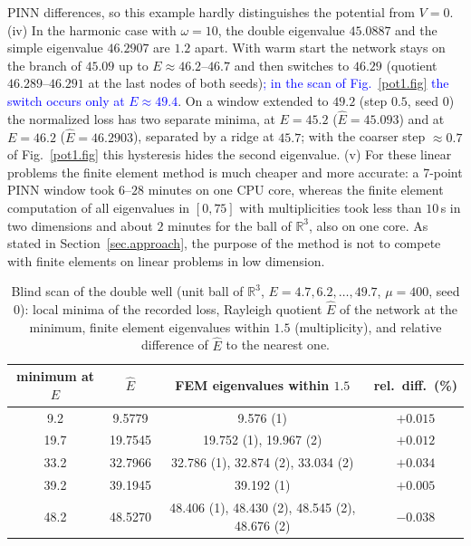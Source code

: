 \documentclass[10pt]{amsart}
\newcommand{\rev}[1]{\textcolor{blue}{#1}}
\newenvironment{revblock}{\color{blue}}{}
\theoremstyle{definition}
\theoremstyle{remark}
\theoremstyle{plain}
\newcommand{\R}{\mathbb{R}}
\begin{document}
\begin{revblock}
PINN differences, so this example hardly distinguishes the potential from $V=0$. (iv) In the harmonic
case with $\omega=10$, the double eigenvalue $45.0887$ and the simple eigenvalue $46.2907$ are $1.2$
apart. With warm start the network stays on the branch of $45.09$ up to $E\approx46.2$--$46.7$ and then
switches to $46.29$ (quotient $46.289$--$46.291$ at the last nodes of both seeds)\rev{; in the scan of Fig.~\ref{pot1.fig} the switch occurs only at $E\approx49.4$}. On a window
extended to $49.2$ (step $0.5$, seed 0) the normalized loss has two separate minima, at $E=45.2$
($\hat E=45.093$) and at $E=46.2$ ($\hat E=46.2903$), separated by a ridge at $45.7$; with the coarser
step $\approx0.7$ of Fig.~\ref{pot1.fig} this hysteresis hides the second eigenvalue. (v) For these
linear problems the finite element method is much cheaper and more accurate: a 7-point PINN window
took $6$--$28$ minutes on one CPU core, whereas the finite element computation of all eigenvalues in
$[0,75]$ with multiplicities took less than $10$\,s in two dimensions and about $2$ minutes for the
ball of $\R^3$, also on one core. As stated in Section~\ref{sec.approach}, the purpose of the method is
not to compete with finite elements on linear problems in low dimension.

\begin{table}[tbp]
\centering\small
\color{blue}
\caption{Blind scan of the double well (unit ball of $\R^3$, $E=4.7,6.2,\dots,49.7$, $\mu=400$, seed 0): local minima of the recorded loss, Rayleigh quotient $\hat E$ of the network at the minimum, finite element eigenvalues within $1.5$ (multiplicity), and relative difference of $\hat E$ to the nearest one.}
\label{table.blind}
\begin{tabular}{cccc}
\toprule
minimum at $E$ & $\hat E$ & FEM eigenvalues within $1.5$ & rel.\ diff.\ (\%)\\
\midrule
9.2 & 9.5779 & 9.576 (1) & $+0.015$\\
19.7 & 19.7545 & 19.752 (1), 19.967 (2) & $+0.012$\\
33.2 & 32.7966 & 32.786 (1), 32.874 (2), 33.034 (2) & $+0.034$\\
39.2 & 39.1945 & 39.192 (1) & $+0.005$\\
48.2 & 48.5270 & 48.406 (1), 48.430 (2), 48.545 (2), 48.676 (2) & $-0.038$\\
\bottomrule
\end{tabular}
\end{table}
\end{revblock}
\end{document}
